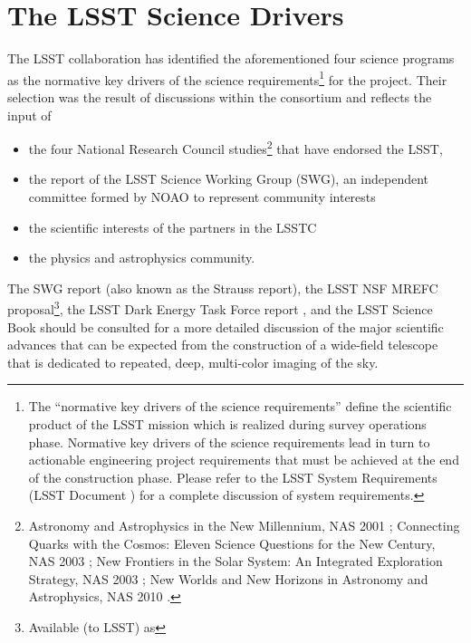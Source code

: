 \section{The LSST Science Drivers }
\label{scidriv}

The LSST collaboration has identified the aforementioned four science
programs as the normative key drivers of the science
requirements\footnote{The ``normative key drivers of the science requirements'' define
the scientific product of the LSST mission which is realized during survey operations phase.
Normative key drivers of the science requirements lead in turn to actionable engineering project
requirements that must be achieved at the end of the construction phase.  Please refer to the
LSST System Requirements (LSST Document ) for a complete discussion of system requirements.}
for the project. Their selection was the result of discussions within the
consortium and reflects the input of
\begin{itemize}
\item the four National Research Council studies\footnote{
  Astronomy and Astrophysics in the New Millennium, NAS 2001 \citep{NAP9839};
  Connecting Quarks with the Cosmos: Eleven Science Questions for the New Century, NAS 2003 \citep{NAP10079};
  New Frontiers in the Solar System: An Integrated Exploration Strategy, NAS 2003 \citep{NAP10432};
  New Worlds and New Horizons in Astronomy and Astrophysics, NAS 2010 \citep{NAP12982}.
} that have endorsed the LSST,
\item the report of the LSST Science Working Group (SWG), an independent
      committee formed by NOAO to represent community interests
\item the scientific interests of the partners in the LSSTC
\item the physics and astrophysics community.
\end{itemize}

The SWG report  (also known as the Strauss
report), the LSST NSF MREFC proposal\footnote{Available (to LSST) as
},
the LSST Dark Energy Task Force report \citep{2006astro.ph..9591A}, and the LSST
Science Book \citep{2009arXiv0912.0201L} should be
consulted for a more detailed discussion of the major scientific advances
that can be expected from the construction of a wide-field telescope that
is dedicated to repeated, deep, multi-color imaging of the sky.

